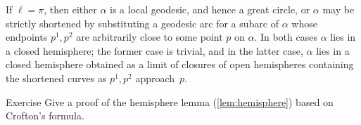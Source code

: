 If $\ell=\pi$, then either $\alpha$ is a local geodesic, and hence a great circle, 
or $\alpha$ may be strictly shortened by substituting a geodesic arc for a subarc of $\alpha$ 
whose endpoints $p^1,p^2$ are arbitrarily close to some point $p$ on $\alpha$.
In both cases $\alpha$ lies in a closed hemisphere;
the former case is trivial, and in the latter case, $\alpha$ lies in a closed hemisphere obtained as a limit of closures of open hemispheres  containing the shortened curves as $p^1,p^2$ approach~$p$.
\qeds




\begin{thm}{Exercise}\label{exr-crofton}
Give a proof of the hemisphere lemma (\ref{lem:hemisphere}) based on Crofton's formula.
\end{thm}







